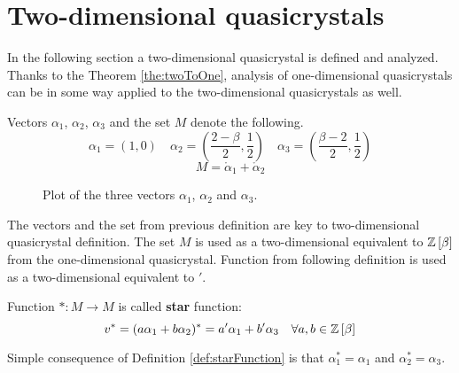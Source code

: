 \documentclass[text.tex]{subfiles}
\begin{document}
\section{Two-dimensional quasicrystals}%
\label{sec:twoDimension}
In the following section a two-dimensional quasicrystal is defined and analyzed. Thanks to the Theorem \ref{the:twoToOne}, analysis of one-dimensional quasicrystals can be in some way applied to the two-dimensional quasicrystals as well. 
\begin{definition}
Vectors $\alpha_1$, $\alpha_2$, $\alpha_3$ and the set $M$ denote the following.
$$\alpha_1 = \left( 1,0 \right) \quad \alpha_2 = \left( \frac{2-\beta}{2}, \frac{1}{2} \right) \quad \alpha_3 = \left( \frac{\beta-2}{2}, \frac{1}{2} \right)$$
$$M = \ring\alpha_1 + \ring\alpha_2$$
\end{definition}

\begin{figure}[h]
\centering
{}
\caption{Plot of the three vectors $\alpha_1$, $\alpha_2$ and $\alpha_3$.}
\end{figure}

\begin{remark}
The vectors and the set from previous definition are key to two-dimensional quasicrystal definition. The set $M$ is used as a two-dimensional equivalent to $\mathbb{Z}\left[\beta\right]$ from the one-dimensional quasicrystal. Function from following definition is used as a two-dimensional equivalent to $'$.
\end{remark}

\begin{definition}
\label{def:starFunction}
Function $\ast: M \to M$ is called \textbf{star} function:
$$v^\ast = (a\alpha_1 + b\alpha_2)^\ast = a'\alpha_1 + b'\alpha_3 \quad\forall a,b\in\mathbb{Z}\left[\beta\right]$$
\end{definition}

\begin{remark}
Simple consequence of Definition \ref{def:starFunction} is that $\alpha_1^\ast = \alpha_1$ and $\alpha_2^\ast = \alpha_3$.
\end{remark}
\end{document}
